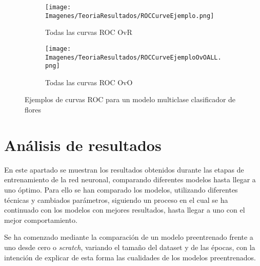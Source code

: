 \documentclass{report}
\begin{document}
\begin{figure}[H]
	 	\centering
	 	\begin{subfigure}[b]{0.45\linewidth}
	 	\centering
	 		\texttt{[image: Imagenes/TeoriaResultados/ROCCurveEjemplo.png]}
                    \caption{ Todas las curvas ROC OvR }
                    \label{fig:CurvasROCOvR}
	 	\end{subfigure}
	 	\centering
	 	\begin{subfigure}[b]{0.45\linewidth}
	 	\centering
	 		\texttt{[image: Imagenes/TeoriaResultados/ROCCurveEjemploOvOALL.png]}
                    \caption{ Todas las curvas ROC OvO }
                    \label{fig:CurvasROCOvO}
	 	\end{subfigure}
	 	\caption{ Ejemplos de curvas ROC para un modelo multiclase clasificador de flores } 
	 	\label{fig:EjemploROCSkicit}
\end{figure}











































\chapter{Análisis de resultados}

 
En este apartado se muestran los resultados obtenidos durante las etapas de entrenamiento de la red neuronal, comparando diferentes modelos hasta llegar a uno óptimo. Para ello se han comparado los modelos, utilizando diferentes técnicas y cambiados parámetros, siguiendo un proceso en el cual se ha continuado con los modelos con mejores resultados, hasta llegar a uno con el mejor comportamiento.

Se ha comenzado mediante la comparación de un modelo preentrenado frente a uno desde cero o \textit{scratch}, variando el tamaño del dataset y de las épocas, con la intención de explicar de esta forma las cualidades de los modelos preentrenados.
\end{document}
